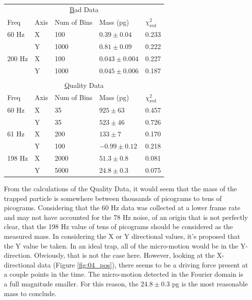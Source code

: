 \documentclass[12pt]{article}
\begin{document}
\begin{table}[ht]
\caption{}
\label{tab:masses}
\centering
\begin{tabular}{lllll}
\multicolumn{5}{c}{{\ul Bad Data}}                                    \\
Freq   & Axis & Num of Bins & Mass (pg)         & $\chi_\text{red}^2$ \\ \hline
60 Hz  & X    & 100         & $0.39 \pm  0.04$  & 0.233               \\
       & Y    & 1000        & $0.81 \pm 0.09$   & 0.222               \\
200 Hz & X    & 100         & $0.043 \pm 0.004$ & 0.227               \\
       & Y    & 1000        & $0.045 \pm 0.006$ & 0.187               \\
       &      &             &                   &                     \\
\multicolumn{5}{c}{{\ul Quality Data}}                                \\
Freq   & Axis & Num of Bins & Mass (pg)         & $\chi_\text{red}^2$ \\ \hline
60 Hz  & X    & 35          & $925 \pm 63$      & 0.457               \\
       & Y    & 35          & $523 \pm 46$      & 0.726               \\
61 Hz  & X    & 200         & $133 \pm 7$       & 0.170               \\
       & Y    & 100         & $-0.99 \pm 0.12$  & 0.218               \\
198 Hz & X    & 2000        & $51.3 \pm 0.8$    & 0.081               \\
       & Y    & 5000        & $24.8 \pm 0.3$    & 0.075              
\end{tabular}
\end{table}

From the calculations of the Quality Data, it would seem that the mass of the trapped particle is somewhere between thousands of picograms to tens of picograms. Considering that the 60 Hz data was collected at a lower frame rate and may not have accounted for the 78 Hz noise, of an origin that is not perfectly clear, that the 198 Hz value of tens of picograms should be considered as the measured mass. In considering the X or Y directional values, it's proposed that the Y value be taken. In an ideal trap, all of the micro-motion would be in the Y-direction. Obviously, that is not the case here. However, looking at the X-directional data (Figure \ref{fig:04_pos}), there seems to be a driving force present at a couple points in the time. The micro-motion detected in the Fourier domain is a full magnitude smaller. For this reason, the $24.8 \pm 0.3$ pg is the most reasonable mass to conclude. 
\end{document}
